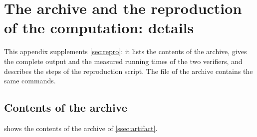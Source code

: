 \section{The archive and the reproduction of the computation: details}\label{sec:supp-repro}

This appendix supplements \cref{sec:repro}: it lists the contents of the archive, gives the complete
output and the measured running times of the two verifiers, and describes the steps of the reproduction
script. The file  of the archive contains the same commands.

\subsection{Contents of the archive}\label{ssec:supp-archive}

 shows the contents of the archive of \cref{ssec:artifact}.

